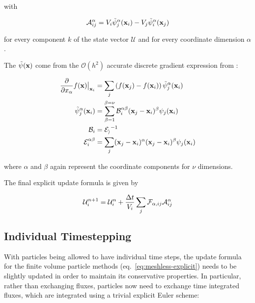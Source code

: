 with

\begin{equation}
	\mathcal{A}_{ij}^\alpha = V_i \tilde{\psi}_j^\alpha (\mathbf{x}_i) - V_j\tilde{\psi}_i^\alpha (\mathbf{x}_j) 			\label{eq:HopkinsAij}
\end{equation}

for every component $k$ of the state vector $\mathcal{U}$ and for every coordinate dimension
$\alpha$.

The $\tilde{\psi}(\mathbf{x})$ come from the $\mathcal{O}(h^2)$ accurate discrete gradient expression from
\cite{lansonRenormalizedMeshfreeSchemes2008}:

\begin{align}
	\frac{\partial}{\partial x_{\alpha}} f(\mathbf{x}) \big{|}_{\mathbf{x}_i} &= 
	\sum_j \left( f(\mathbf{x}_j) - f(\mathbf{x}_i) \right) \tilde{\psi}_j^\alpha (\mathbf{x}_i) 		\label{eq:gradient} \\
	\tilde{\psi}_j^\alpha (\mathbf{x}_i) &= \sum_{\beta = 1}^{\beta=\nu} \mathcal{B}_i^{\alpha \beta}
	(\mathbf{x}_j - \mathbf{x}_i)^\beta \psi_j(\mathbf{x}_i) 	\\
	\mathcal{B}_i &= \mathcal{E_i} ^ {-1} \label{eq:matrix-B}\\
	\mathcal{E}_i^{\alpha \beta} &= \sum_j (\mathbf{x}_j - \mathbf{x}_i)^\alpha (\mathbf{x}_j - \mathbf{x}_i)^\beta \psi_j(\mathbf{x}_i)
\label{eq:matrix-E}
\end{align}


where $\alpha$ and $\beta$ again represent the coordinate components for $\nu$ dimensions.


The final explicit update formula is given by

\begin{align}
    \mathcal{U}_i^{n+1} = \mathcal{U}_i^{n} + \frac{\Delta t}{V_i} \sum_j  \mathcal{F}_{\alpha, ij} \mathcal{A}_{ij}^\alpha
\label{eq:meshless-explicit}
\end{align}








\subsection{Individual Timestepping}

With particles being allowed to have individual time steps, the update formula for the finite volume
particle methods (eq.~\ref{eq:meshless-explicit}) needs to be slightly updated in order to
maintain its conservative properties. In particular, rather than exchanging fluxes, particles now
need to exchange time integrated fluxes, which are integrated using a trivial explicit Euler scheme:


